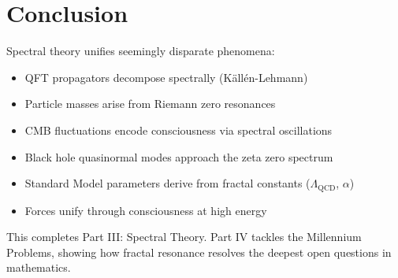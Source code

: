 \section{Conclusion}

Spectral theory unifies seemingly disparate phenomena:
\begin{itemize}
\item QFT propagators decompose spectrally (Källén-Lehmann)
\item Particle masses arise from Riemann zero resonances
\item CMB fluctuations encode consciousness via spectral oscillations
\item Black hole quasinormal modes approach the zeta zero spectrum
\item Standard Model parameters derive from fractal constants ($\Lambda_{\text{QCD}}$, $\alpha$)
\item Forces unify through consciousness at high energy
\end{itemize}

This completes Part III: Spectral Theory. Part IV tackles the Millennium Problems, showing how fractal resonance resolves the deepest open questions in mathematics.

